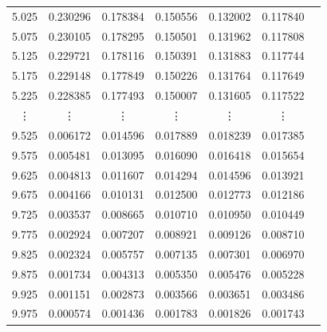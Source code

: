 \documentclass[a4j, titlepage]{jsarticle}
\numberwithin{equation}{section}
\begin{document}
\begin{table}[h]
\begin{tabular}{ccccccc}
                    5.025 & 0.230296 & 0.178384 & 0.150556 & 0.132002 & 0.117840 \\
                    5.075 & 0.230105 & 0.178295 & 0.150501 & 0.131962 & 0.117808 \\
                    5.125 & 0.229721 & 0.178116 & 0.150391 & 0.131883 & 0.117744 \\
                    5.175 & 0.229148 & 0.177849 & 0.150226 & 0.131764 & 0.117649 \\
                    5.225 & 0.228385 & 0.177493 & 0.150007 & 0.131605 & 0.117522 \\
                    \vdots & \vdots & \vdots & \vdots & \vdots & \vdots \vspace{1mm} \\
                    9.525 & 0.006172 & 0.014596 & 0.017889 & 0.018239 & 0.017385 \\
                    9.575 & 0.005481 & 0.013095 & 0.016090 & 0.016418 & 0.015654 \\
                    9.625 & 0.004813 & 0.011607 & 0.014294 & 0.014596 & 0.013921 \\
                    9.675 & 0.004166 & 0.010131 & 0.012500 & 0.012773 & 0.012186 \\
                    9.725 & 0.003537 & 0.008665 & 0.010710 & 0.010950 & 0.010449 \\
                    9.775 & 0.002924 & 0.007207 & 0.008921 & 0.009126 & 0.008710 \\
                    9.825 & 0.002324 & 0.005757 & 0.007135 & 0.007301 & 0.006970 \\
                    9.875 & 0.001734 & 0.004313 & 0.005350 & 0.005476 & 0.005228 \\
                    9.925 & 0.001151 & 0.002873 & 0.003566 & 0.003651 & 0.003486 \\
                    9.975 & 0.000574 & 0.001436 & 0.001783 & 0.001826 & 0.001743 \\
                    \hline																	
                \end{tabular}
            \end{table}
\end{document}
